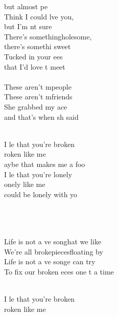 \begin{cancion}[Broken][lovelytheband]
	but almost pe\\
	Think I could lve you, \\
	but I’m nt sure\\
	There’s somethingholesome, \\
	there’s somethi sweet\\
	Tucked in your ees \\
	that I’d love t meet\\
\jump\\
	These aren’t mpeople\\
	These aren’t mfriends\\
	She grabbed my ace \\
	and that’s when sh said\\\jump\\
	\begin{chorus}%
	I le that you’re broken\\
	roken like me\\
	aybe that makes me a foo\\
	I le that you’re lonely\\
	onely like me\\
	 could be lonely with yo\\
	\end{chorus}%
	\jump\\
{}\vspace*{-0.4cm}\\
	      \\
	Life is not a ve songhat we like\\
	We’re all brokepiecesfloating by\\
	Life is not a ve songe can try\\
	To fix our broken eces one t a time\\\jump\\
	\begin{chorus}%
	I le that you’re broken\\
	roken like me\\

\end{chorus}
\end{cancion}
